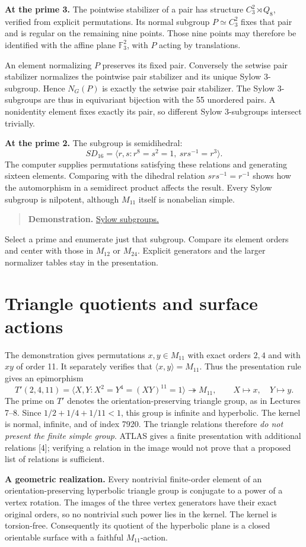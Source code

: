 \documentclass[12pt,letterpaper]{article}
\theoremstyle{definition}
\theoremstyle{remark}
\newenvironment{toolnote}{\begin{quote}\small\color{navy}}{\end{quote}}
\newcommand{\F}{\mathbb F}\newcommand{\Z}{\mathbb Z}
\newcommand{\pageheading}[1]{\clearpage\section{#1}}
\newcommand{\demolink}[2]{\href{https://gtevelev-max.github.io/mathieu/\##1}{#2}}
\newcommand{\demobox}[2]{\begin{toolnote}\textbf{Demonstration.} \demolink{#1}{#2}\end{toolnote}}
\begin{document}
\textbf{At the prime 3.} The pointwise stabilizer of a pair has structure $C_3^2\rtimes Q_8$, verified from explicit permutations. Its normal subgroup $P\simeq C_3^2$ fixes that pair and is regular on the remaining nine points. Those nine points may therefore be identified with the affine plane $\F_3^2$, with $P$ acting by translations.

An element normalizing $P$ preserves its fixed pair. Conversely the setwise pair stabilizer normalizes the pointwise pair stabilizer and its unique Sylow 3-subgroup. Hence $N_G(P)$ is exactly the setwise pair stabilizer. The Sylow 3-subgroups are thus in equivariant bijection with the 55 unordered pairs. A nonidentity element fixes exactly its pair, so different Sylow 3-subgroups intersect trivially.

\textbf{At the prime 2.} The subgroup is semidihedral:
\[
 SD_{16}=\langle r,s:r^8=s^2=1,\ srs^{-1}=r^3\rangle.
\]
The computer supplies permutations satisfying these relations and generating sixteen elements. Comparing with the dihedral relation $srs^{-1}=r^{-1}$ shows how the automorphism in a semidirect product affects the result. Every Sylow subgroup is nilpotent, although $M_{11}$ itself is nonabelian simple.

\demobox{sylow?group=11}{Sylow subgroups.} Select a prime and enumerate just that subgroup. Compare its element orders and center with those in $M_{12}$ or $M_{24}$. Explicit generators and the larger normalizer tables stay in the presentation.

\hypertarget{triangles}{}
\pageheading{Triangle quotients and surface actions}
The demonstration gives permutations $x,y\in M_{11}$ with exact orders $2,4$ and with $xy$ of order 11. It separately verifies that $\langle x,y\rangle=M_{11}$. Thus the presentation rule gives an epimorphism
\[
 T'(2,4,11)=\langle X,Y:X^2=Y^4=(XY)^{11}=1\rangle
 \twoheadrightarrow M_{11},\qquad X\mapsto x,\quad Y\mapsto y.
\]
The prime on $T'$ denotes the orientation-preserving triangle group, as in Lectures 7--8. Since $1/2+1/4+1/11<1$, this group is infinite and hyperbolic. The kernel is normal, infinite, and of index 7920. The triangle relations therefore \emph{do not present the finite simple group}. ATLAS gives a finite presentation with additional relations [4]; verifying a relation in the image would not prove that a proposed list of relations is sufficient.

\textbf{A geometric realization.} Every nontrivial finite-order element of an orientation-preserving hyperbolic triangle group is conjugate to a power of a vertex rotation. The images of the three vertex generators have their exact original orders, so no nontrivial such power lies in the kernel. The kernel is torsion-free. Consequently its quotient of the hyperbolic plane is a closed orientable surface with a faithful $M_{11}$-action.
\end{document}
